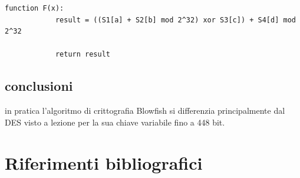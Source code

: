 \documentclass[a4paper,12pt]{report}
\begin{document}
	\begin{lstlisting}[style=pseudocode]
		function F(x):
			result = ((S1[a] + S2[b] mod 2^32) xor S3[c]) + S4[d] mod 2^32
			
			return result
	\end{lstlisting}
	\section*{conclusioni}
	in pratica l'algoritmo di crittografia Blowfish si differenzia
	principalmente dal DES visto a lezione per la sua chiave variabile fino a
	448 bit. \cite{blfh-lenth-key}







	\newpage
	
	\renewcommand{\bibsection}{}
	\chapter*{Riferimenti bibliografici}
	
\end{document}
